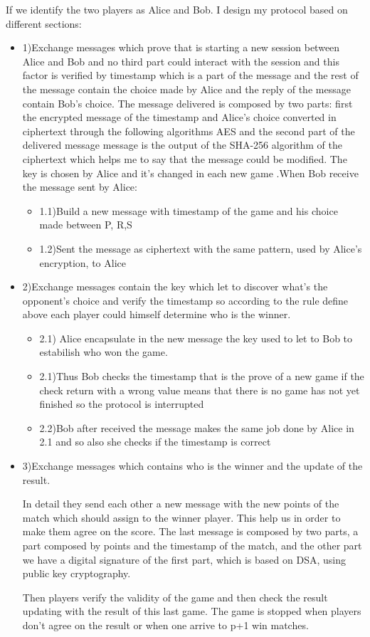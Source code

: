 \documentclass[11pt,a4paper]{article}
\begin{document}
	If we identify the two players as Alice and Bob.
    I design my protocol based on different sections:
    \begin{itemize}
        \item 1)Exchange messages which prove that is starting a new session between Alice and Bob and no third part could interact with the session and this factor is verified by timestamp which is a part of the message and the rest of the message contain the choice made by Alice and the reply of the message contain Bob's choice. The message delivered is composed by two parts: first the encrypted message of the timestamp and Alice's choice converted in ciphertext through the following algorithms AES and the second part of the delivered message message is the output of the SHA-256
algorithm of the ciphertext which helps me to say that the message could be modified. The key is chosen by Alice and it's changed in each new game .When Bob receive the message sent by Alice:
        \begin{itemize}
            \item 1.1)Build a new message with timestamp of the game and his choice made between P, R,S
            \item 1.2)Sent the message as ciphertext with the same pattern, used by Alice's encryption, to Alice
        \end{itemize}
        \item 2)Exchange messages contain the key which let to discover what's the opponent's choice and verify the timestamp so according to the rule define above each player could himself determine who is the winner.
        \begin{itemize}
            \item 2.1) Alice encapsulate in the new message the key used to let to Bob to estabilish who won the game. 
            
        \item 2.1)Thus Bob checks the timestamp that is the prove of a new game if the check return with a wrong value means that there is no game has not yet
finished so the protocol is interrupted
            \item 2.2)Bob after received the message makes the same job done by Alice in 2.1 and so also she checks if the timestamp is correct
        \end{itemize}
        \item 3)Exchange messages which contains who is the winner and the update of the result.
        
        In detail they send each other a new message with the new points of the match which should assign to the winner player. This help us in order to make them agree on the score.
The last message is composed by two
parts, a part composed by points and the timestamp of the match,
and the other part we have a digital signature of the first part, which is
based on DSA, using public key cryptography.


Then players verify the validity of the game and then check the result updating with the result of this last game. The game is stopped when players don't agree on the result or when one arrive to p+1 win matches.
    \end{itemize}
\end{document}
